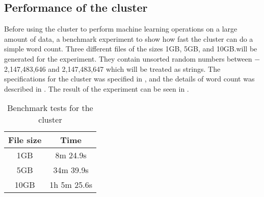 \subsection{Performance of the cluster}\label{sec:benchmark}
Before using the cluster to perform machine learning operations on a large amount of data, a benchmark experiment to show how fast the cluster can do a simple word count. Three different files of the sizes 1GB, 5GB, and 10GB.\@ will be generated for the experiment. They contain unsorted random numbers between $-$2,147,483,646 and 2,147,483,647 which will be treated as strings. The specifications for the cluster was specified in , and the details of word count was described in . The result of the experiment can be seen in . 
\begin{table}[!htb]
  \centering
  \begin{tabular}{|c|c|}
    \hline
    File size & Time \\
    \hline
    1GB & 8m 24.9s  \\ %
    5GB & 34m 39.9s \\ %
    10GB & 1h 5m 25.6s \\ %
    \hline
  \end{tabular}
  \caption{Benchmark tests for the cluster}
  \label{tab:bench}
\end{table}


